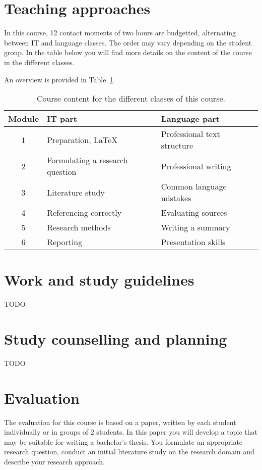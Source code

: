 \section{Teaching approaches}
\label{sec:teachingapproach}

In this course, 12 contact moments of two hours are budgetted, alternating between IT and language classes. The order may vary depending on the student group. In the table below you will find more details on the content of the course in the different classes. 

An overview is provided in Table~\ref{tab:planning}.

\begin{table}
  \centering\begin{tabular}{cll}
    \toprule
    \textbf{Module} & \textbf{IT part}               & \textbf{Language part}                   \\
    \midrule
    1               & Preparation, {\LaTeX}        & Professional text structure \\
    2               & Formulating a research question & Professional writing     \\
    3               & Literature study               & Common language mistakes                 \\
    4               & Referencing correctly              & Evaluating sources   \\
    5               & Research methods             & Writing a summary          \\
    6               & Reporting                    & Presentation skills       \\
  \end{tabular}
  \caption{\label{tab:planning}Course content for the different classes of this course.}
\end{table}

\section{Work and study guidelines}
\label{sec:workstudyguidelines}

TODO

\section{Study counselling and planning}
\label{sec:studycounsellingplanning}

TODO

\section{Evaluation}
\label{sec:evaluation}
The evaluation for this course is based on a paper, written by each student individually or in groups of 2 students. In this paper you will develop a topic that may be suitable for writing a bachelor's thesis. You formulate an appropriate research question, conduct an initial literature study on the research domain and describe your research approach.

